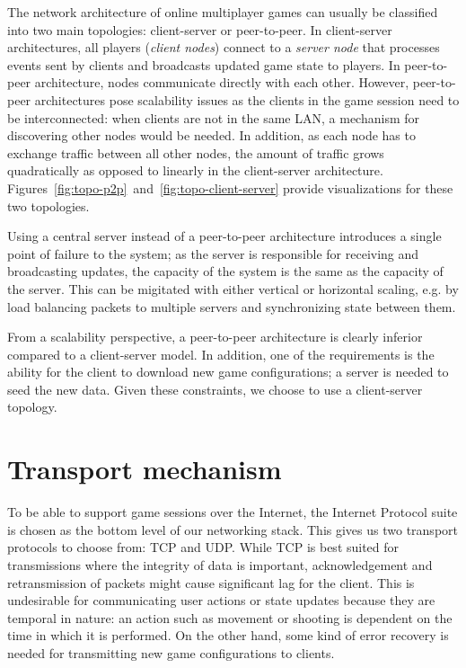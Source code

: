\documentclass[sigconf, nonacm=true, natbib=false]{acmart}
\begin{document}
The network architecture of online multiplayer games can usually be classified into two main topologies: client-server or peer-to-peer.
In client-server architectures, all players (\emph{client nodes}) connect to a \emph{server node} that processes events sent by clients
and broadcasts updated game state to players. In peer-to-peer architecture, nodes communicate directly with each other.
However, peer-to-peer architectures pose scalability issues as the clients in the game session need to be interconnected:
when clients are not in the same LAN, a mechanism for discovering other nodes would be needed. In addition, as each node
has to exchange traffic between all other nodes, the amount of traffic grows quadratically \cite{Smed1} as opposed to linearly
in the client-server architecture. Figures~\ref{fig:topo-p2p}~and~\ref{fig:topo-client-server} provide visualizations for these
two topologies.

Using a central server instead of a peer-to-peer architecture introduces a single point of failure to the system; as the
server is responsible for receiving and broadcasting updates, the capacity of the system is the same as the capacity of
the server. This can be migitated with either vertical or horizontal scaling, e.g. by load balancing packets to multiple
servers and synchronizing state between them.

From a scalability perspective, a peer-to-peer architecture is clearly inferior compared to a client-server model.
In addition, one of the requirements is the ability for the client to download new game configurations; a server is needed
to seed the new data. Given these constraints, we choose to use a client-server topology.


\section{Transport mechanism}
To be able to support game sessions over the Internet, the Internet Protocol suite is chosen as the bottom level of our
networking stack. This gives us two transport protocols to choose from: TCP and UDP. While TCP is best suited for transmissions
where the integrity of data is important, acknowledgement and retransmission of packets might cause significant lag for the client.
This is undesirable for communicating user actions or state updates because they are temporal in nature: an action such as movement or shooting
is dependent on the time in which it is performed. On the other hand, some kind of error recovery is needed for transmitting
new game configurations to clients.
\end{document}
